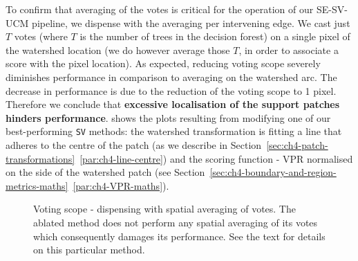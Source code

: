 To confirm %
that averaging of the votes is critical for the operation %
of our SE-SV-UCM pipeline, we dispense with the averaging per intervening edge. We cast just $T$ votes (where $T$ is the number of trees in the decision forest) on a single pixel of the watershed location (we do however average those $T$, in order to associate a score with the pixel location). 
As expected, reducing voting scope severely diminishes performance in comparison to averaging on the watershed arc. %
The decrease in performance is due to the reduction of the voting scope to 1 pixel. Therefore we conclude that {\bf excessive localisation of the support patches hinders performance}.
 shows the plots resulting from modifying one of our best-performing {\tt SV} methods: the watershed transformation is fitting a line that adheres to the centre of the patch (as we describe in Section~\ref*{sec:ch4-patch-transformations}~\ref{par:ch4-line-centre}) and the scoring function - VPR normalised on the side of the watershed patch (see Section~\ref*{sec:ch4-boundary-and-region-metrics-maths}~\ref{par:ch4-VPR-maths}).

\begin{figure}[t]
\centering
\caption[Voting scope: dispensing with spatial averaging of votes - plots]{Voting scope - dispensing with spatial averaging of votes. The ablated method does not perform any spatial averaging of its votes which consequently damages its performance. See the text for details on this particular method.}
\label{fig:reduced-vote-scope}
\end{figure}

